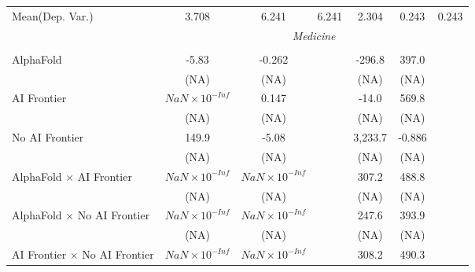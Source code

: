 \begin{tabular}{lcccccc}
Mean(Dep. Var.) & 3.708 & 6.241 & 6.241 & 2.304 & 0.243 & 0.243 \\
 & \multicolumn{6}{c}{\textit{Medicine}} \\ \\
   AlphaFold                                                                  & -5.83                  & -0.262                 &                        & -296.8  & 397.0  &   \\   
                                                                              & (NA)                   & (NA)                   &                        & (NA)    & (NA)   &   \\   
   AI Frontier                                                                & $NaN\times 10^{-Inf}$  & 0.147                  &                        & -14.0   & 569.8  &   \\   
                                                                              & (NA)                   & (NA)                   &                        & (NA)    & (NA)   &   \\   
   No AI Frontier                                                             & 149.9                  & -5.08                  &                        & 3,233.7 & -0.886 &   \\   
                                                                              & (NA)                   & (NA)                   &                        & (NA)    & (NA)   &   \\   
   AlphaFold $\times$ AI Frontier                                             & $NaN\times 10^{-Inf}$  & $NaN\times 10^{-Inf}$  &                        & 307.2   & 488.8  &   \\   
                                                                              & (NA)                   & (NA)                   &                        & (NA)    & (NA)   &   \\   
   AlphaFold $\times$ No AI Frontier                                          & $NaN\times 10^{-Inf}$  & $NaN\times 10^{-Inf}$  &                        & 247.6   & 393.9  &   \\   
                                                                              & (NA)                   & (NA)                   &                        & (NA)    & (NA)   &   \\   
   AI Frontier $\times$ No AI Frontier                                        & $NaN\times 10^{-Inf}$  & $NaN\times 10^{-Inf}$  &                        & 308.2   & 490.3  &   \\   

\end{tabular}
